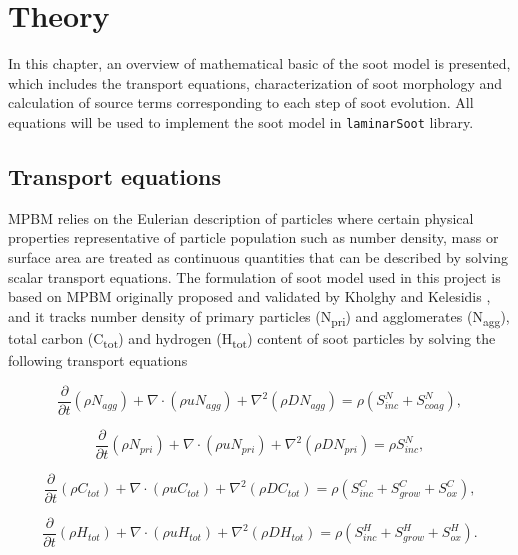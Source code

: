 \chapter{Theory}
In this chapter, an overview of mathematical basic of the soot model is presented, which includes the transport equations, characterization of soot morphology and calculation of source terms corresponding to each step of soot evolution. All equations will be used to implement the soot model in \verb|laminarSoot| library. 
\section{Transport equations}

MPBM relies on the Eulerian description of particles where certain physical properties representative of particle population such as number density, mass or surface area are treated as continuous quantities that can be described by solving scalar transport equations. The formulation of soot model used in this project is based on MPBM originally proposed and validated by Kholghy and Kelesidis \cite{Kholghy2021}, and it tracks number density of primary particles (N\textsubscript{pri}) and agglomerates (N\textsubscript{agg}), total carbon (C\textsubscript{tot}) and hydrogen (H\textsubscript{tot}) content of soot particles by solving the following transport equations

\begin{equation}
	\frac{\partial}{\partial t}(\rho N_{agg}) + \nabla\cdot(\rho u N_{agg})+\nabla^2(\rho D N_{agg}) = \rho\left( S^N_{inc} + S^N_{coag} \right)
	\label{eqn:N_agg},
\end{equation}

\begin{equation}
	\frac{\partial}{\partial t}(\rho N_{pri}) + \nabla\cdot(\rho u N_{pri})+\nabla^2(\rho D N_{pri}) = \rho S^N_{inc}
	\label{eqn:N_pri},
\end{equation}

\begin{equation}
	\frac{\partial}{\partial t}(\rho C_{tot}) + \nabla\cdot(\rho u C_{tot})+\nabla^2(\rho D C_{tot}) = \rho\left( S^C_{inc} + S^C_{grow} + S^C_{ox} \right)
	\label{eqn:C_tot},
\end{equation}

\begin{equation}
	\frac{\partial}{\partial t}(\rho H_{tot}) + \nabla\cdot(\rho u H_{tot})+\nabla^2(\rho D H_{tot}) = \rho\left( S^H_{inc} + S^H_{grow} + S^H_{ox} \right)
	\label{eqn:H_tot}.
\end{equation}

